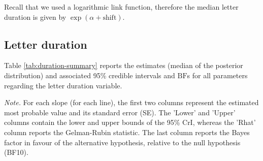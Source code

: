 \documentclass[
  11pt,
  english,
  ,doc,floatsintext]{apa6}
\newenvironment{lltable}{\begin{landscape}\centering\begin{ThreePartTable}}{\end{ThreePartTable}\end{landscape}}
\begin{document}
Recall that we used a logarithmic link function, therefore the median letter duration is given by \(\exp(\alpha + \text{shift})\).

\hypertarget{letter-duration}{%
\subsection{Letter duration}\label{letter-duration}}

Table \ref{tab:duration-summary} reports the estimates (median of the posterior distribution) and associated 95\% credible intervals and \(\text{BF}\)s for all parameters regarding the letter duration variable.

\begin{lltable}

\begin{TableNotes}[para]
\normalsize{\textit{Note.} For each slope (for each line), the first two columns represent the
    estimated most probable value and its standard error (SE). The 'Lower' and
    'Upper' columns contain the lower and upper bounds of the 95\% CrI, whereas
    the 'Rhat' column reports the Gelman-Rubin statistic. The last column reports
    the Bayes factor in favour of the alternative hypothesis, relative to the
    null hypothesis (BF10).}
\end{TableNotes}

\scriptsize{

}
\end{lltable}
\end{document}
